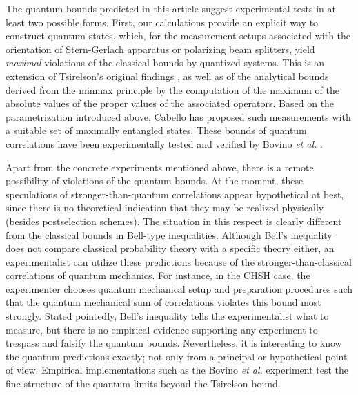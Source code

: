 \documentclass[pra,showpacs,showkeys,amsfonts]{revtex4}
\begin{document}
The quantum bounds predicted in this article
suggest experimental tests in at least two possible forms.
First, our calculations provide an explicit way to construct quantum states, which,
for the measurement setups associated with the orientation of Stern-Gerlach apparatus
or polarizing beam splitters,
yield {\em maximal} violations of the classical bounds by quantized systems.
This is an extension of Tsirelson's original findings \cite{cirelson:80,cirelson},
as well as of the analytical
bounds derived from the minmax principle \cite[\S 90]{halmos-vs} by the computation of the
maximum of the absolute values of the proper values of the associated operators.
Based on the parametrization introduced above, Cabello has proposed such measurements
\cite{cabello-2003a} with a suitable set of maximally entangled states.
These bounds of quantum correlations
have been experimentally tested and verified by Bovino {\it et al.}
\cite{bovino-2003}.

Apart from the concrete experiments mentioned above,
there is a remote possibility of violations of the quantum bounds.
At the moment, these speculations of stronger-than-quantum correlations
\cite{pop-rohr,mermin-1995,svozil-krenn} appear
hypothetical at best, since there is no theoretical indication
that they may be realized physically (besides postselection schemes).
The situation in this respect is clearly different
from the classical bounds in Bell-type inequalities.
Although Bell's inequality does not compare classical probability theory
with a specific theory either, an experimentalist
can utilize these predictions because of
the stronger-than-classical correlations of quantum mechanics.
For instance, in the CHSH case, the experimenter chooses
quantum mechanical setup and preparation procedures such that
the quantum mechanical sum of correlations  violates this bound
most strongly.  Stated pointedly,
Bell's inequality tells the experimentalist what to
measure, but there is no empirical evidence supporting
any experiment to trespass and falsify the quantum bounds.
Nevertheless, it is interesting to know the quantum predictions exactly;
not only from a principal or hypothetical point of view.
Empirical implementations such as the Bovino {\it et al.}
\cite{bovino-2003} experiment test the fine structure of the quantum limits
beyond the  Tsirelson bound.





%
%
%
%
\end{document}
